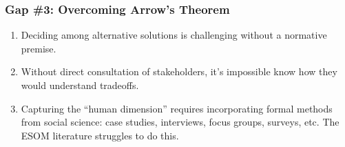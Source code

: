 \begin{frame}
    \frametitle{Gap \#3: Overcoming Arrow's Theorem}

    \begin{enumerate}
        \item Deciding among alternative solutions is challenging without a normative premise.
        \item Without direct consultation of stakeholders, it's impossible know how they would understand tradeoffs.
        \item Capturing the ``human dimension'' requires incorporating formal methods from social science: case studies,
        interviews, focus groups, surveys, etc. The ESOM literature struggles to do this.
    \end{enumerate}

\end{frame}